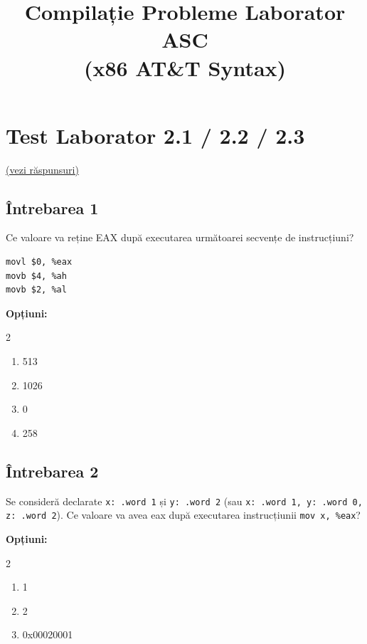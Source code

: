 \documentclass[12pt,a4paper]{article}
\title{Compilație Probleme Laborator ASC \\ (x86 AT\&T Syntax)}
\author{}
\date{}
\begin{document}
\maketitle
\tableofcontents
\newpage


\section{Test Laborator 2.1 / 2.2 / 2.3} \label{sec:lab2} \hfill \hyperref[sec:rezolvari]{\small (vezi răspunsuri)}
\subsection*{Întrebarea 1}
Ce valoare va reține EAX după executarea următoarei secvențe de instrucțiuni?

\begin{lstlisting}[language=x86asm]
movl $0, %eax
movb $4, %ah
movb $2, %al
\end{lstlisting}

\textbf{Opțiuni:}
\begin{multicols}{2}
\begin{enumerate}[label=\alph*)]
    \item 513
    \item 1026
    \item 0
    \item 258
\end{enumerate}
\end{multicols}

\subsection*{Întrebarea 2}
Se consideră declarate \texttt{x: .word 1} și \texttt{y: .word 2} (sau \texttt{x: .word 1, y: .word 0, z: .word 2}). Ce valoare va avea eax după executarea instrucțiunii \texttt{mov x, \%eax}?

\textbf{Opțiuni:}
\begin{multicols}{2}
\begin{enumerate}[label=\alph*)]
    \item 1 
    \item 2
    \item 0x00020001
\end{enumerate}
\end{multicols}
\end{document}

